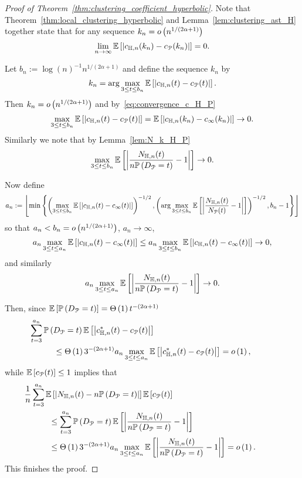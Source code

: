 \begin{proof}[Proof of Theorem~\ref{thm:clustering_coefficient_hyperbolic}]
Note that Theorem~\ref{thm:local_clustering_hyperbolic} and Lemma~\ref{lem:clustering_ast_H} together state that for any sequence $k_n  = o\left(n^{1/(2\alpha + 1)}\right)$
\begin{equation}\label{eq:convergence_c_H_P}
	\lim_{n \to \infty} \mathbb{E}\left[\left|c_{\mathbb{H},n}(k_n) - c_{{\mathcal P}}(k_n)\right|\right] = 0.
\end{equation}

Let $b_n := \log(n)^{-1} n^{1/(2\alpha + 1)}$ and define the sequence $k_n$ by
\[
	k_n = \arg \max_{3 \le t \le b_n} \mathbb{E}\left[\left|c_{\mathbb{H},n}(t) - c_{{\mathcal P}}(t)\right|\right].
\]
Then $k_n = o\left(n^{1/(2\alpha + 1)}\right)$ and by~\eqref{eq:convergence_c_H_P}
\[
	\max_{3 \le t \le b_n} \mathbb{E}\left[\left|c_{\mathbb{H},n}(t) - c_{{\mathcal P}}(t)\right|\right] = \mathbb{E}\left[\left|c_{\mathbb{H},n}(k_n) - c_{\infty}(k_n)\right|\right] \to 0.
\]
Similarly we note that by Lemma~\ref{lem:N_k_H_P}
\[
	\max_{3 \le t \le b_n} \mathbb{E}\left[\left|\frac{N_{\mathbb{H},n}(t)}{n \mathbb{P}\left(D_{{\mathcal P}} = t\right)} - 1\right|\right] \to 0.
\]

Now define
\[
	a_n := \left\lfloor \min \left\{
	\left(\max_{3 \le t \le b_n} \mathbb{E}\left[\left|c_{\mathbb{H},n}(t) - c_{\infty}(t)\right|\right]\right)^{-1/2},
	\left(\arg \max_{3 \le t \le b_n} \mathbb{E}\left[\left|\frac{N_{\mathbb{H},n}(t)}{N_{{\mathcal P}}(t)} - 1\right|\right]\right)^{-1/2},
	b_n - 1 \right\} \right\rfloor
\]
so that $a_n < b_n = o\left(n^{1/(2\alpha + 1)}\right)$, $a_n \to \infty$, 
\[
	a_n \max_{3 \le t \le a_n} \mathbb{E}\left[\left|c_{\mathbb{H},n}(t) - c_{\infty}(t)\right|\right] 
	\le a_n \max_{3 \le t \le b_n} \mathbb{E}\left[\left|c_{\mathbb{H},n}(t) - c_{\infty}(t)\right|\right] \to 0,
\]
and similarly
\[
	a_n \max_{3 \le t \le a_n} \mathbb{E}\left[\left|\frac{N_{\mathbb{H},n}(t)}{n \mathbb{P}\left(D_{{\mathcal P}} = t\right)} - 1\right|\right] \to 0.
\]

Then, since $\mathbb{E}\left[\mathbb{P}\left(D_{{\mathcal P}} = t\right)\right] = \Theta\left(1\right) t^{-(2\alpha + 1)}$
\begin{align*}
	&\hspace{-30pt}\sum_{t = 3}^{a_n} \Prob{D_\Pcal = t} \Exp{\left|c_{\H,n}^\ast(t) - c_{\Pcal}(t)\right|}\\
	&\le \bigT{1} 3^{-(2\alpha+1)} a_n \max_{3 \le t \le a_n} \Exp{\left|c_{\H,n}^\ast(t) - c_{\Pcal}(t)\right|}
	= \smallO{1},
\end{align*}
while $\mathbb{E}\left[c_{{\mathcal P}}(t)\right] \le 1$ implies that
\begin{align*}
	&\hspace{-30pt}\frac{1}{n} \sum_{t = 3}^{a_n} \Exp{\left|N_{\H,n}(t) - n \Prob{D_\Pcal = t}\right|}\Exp{c_\Pcal(t)} \\
	&\le \sum_{t = 3}^{a_n} \Prob{D_\Pcal = t} \Exp{\left|\frac{N_{\H,n}(t)}{n \Prob{D_\Pcal = t}} - 1\right|} \\
	&\le \bigT{1} 3^{-(2\alpha+1)} a_n \max_{3 \le t \le a_n} 
		\Exp{\left|\frac{N_{\H,n}(t)}{n \Prob{D_\Pcal = t}} - 1\right|} = \smallO{1}.
\end{align*}
This finishes the proof. %
\end{proof}
